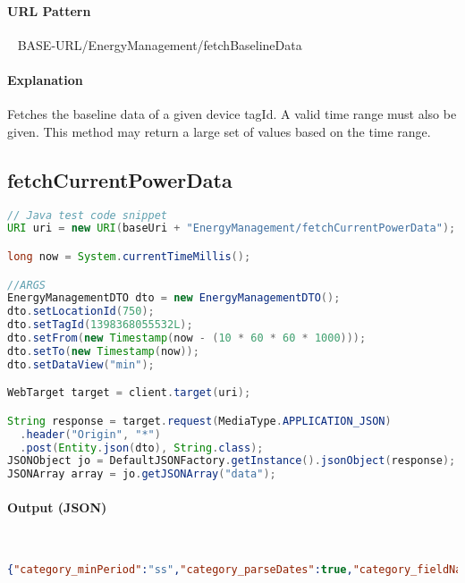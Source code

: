 \documentclass[
10pt, %
letterpaper, %
oneside, %
headinclude,footinclude, %
BCOR5mm, %
]{scrartcl}
\begin{document}
\paragraph{URL Pattern} 
~\newline
BASE-URL/EnergyManagement/fetchBaselineData

\paragraph{Explanation} Fetches the baseline data of a given device tagId. A valid time range must also be given. This method may return a large set of values based on the time range.


\subsection{\textbf{fetchCurrentPowerData}}

\begin{lstlisting}[language=Java]
// Java test code snippet
URI uri = new URI(baseUri + "EnergyManagement/fetchCurrentPowerData");        

long now = System.currentTimeMillis();

//ARGS
EnergyManagementDTO dto = new EnergyManagementDTO();
dto.setLocationId(750);
dto.setTagId(1398368055532L);
dto.setFrom(new Timestamp(now - (10 * 60 * 60 * 1000)));
dto.setTo(new Timestamp(now));
dto.setDataView("min");

WebTarget target = client.target(uri);

String response = target.request(MediaType.APPLICATION_JSON)
  .header("Origin", "*")
  .post(Entity.json(dto), String.class);
JSONObject jo = DefaultJSONFactory.getInstance().jsonObject(response);
JSONArray array = jo.getJSONArray("data");        
\end{lstlisting}

\paragraph{Output (JSON)} ~
\begin{lstlisting}[language=json]
{"category_minPeriod":"ss","category_parseDates":true,"category_fieldName":"x","data":[{"y00":316142.0911458333,"x":1404372060000},{"y00":316142.0911458333,"x":1404372120000},{"y00":318033.68072916666,"x":1404372180000},{"y00":320159.5260416666,"x":1404372240000},{"y00":316298.3947916667,"x":1404372300000},{"y00":316549.3114583333,"x":1404372360000},{"y00":316329.03489583335,"x":1404372420000},{"y00":311928.7729166667,"x":1404372480000},{"y00":313797.12604166666,"x":1404372540000},{"y00":313572.5526041667,"x":1404372600000},{"y00":313185.6244791667,"x":1404372660000},{"y00":317352.1666666667,"x":1404372720000},{"y00":324432.31614583335,"x":1404372780000}....}
\end{lstlisting}
\end{document}
